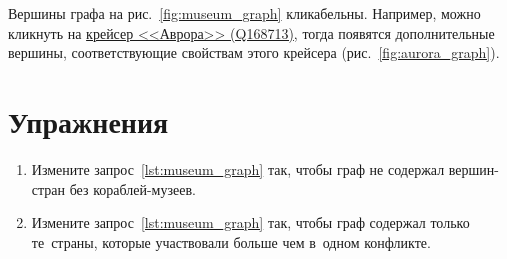 Вершины графа на рис.~\ref{fig:museum_graph} кликабельны. 
Например, можно кликнуть на \href{https://www.wikidata.org/wiki/Q168713}{крейсер <<Аврора>> (Q168713)}, 
тогда появятся дополнительные вершины, соответствующие свойствам этого крейсера (рис.~\ref{fig:aurora_graph}).


\section{Упражнения}
\begin{enumerate}
  \item Измените запрос~\ref{lst:museum_graph} так, 
      чтобы граф не содержал вершин-стран без кораблей-музеев. 
  
  \item Измените запрос~\ref{lst:museum_graph} так, чтобы граф содержал 
      только те~страны, которые участвовали больше чем в~одном конфликте.
\end{enumerate}


